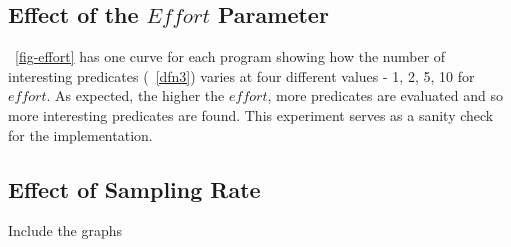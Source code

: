 \subsection{Effect of the $Effort$ Parameter}
~\autoref{fig-effort} has one curve for each program showing how the number of interesting predicates (~\autoref{dfn3}) varies at four different values - 1, 2, 5, 10 for $effort$.  As expected, the higher the $effort$, more predicates are evaluated and so more interesting predicates are found.  This experiment serves as a sanity check for the implementation.

\subsection{Effect of Sampling Rate}
\label{sec-sampling}
Include the graphs